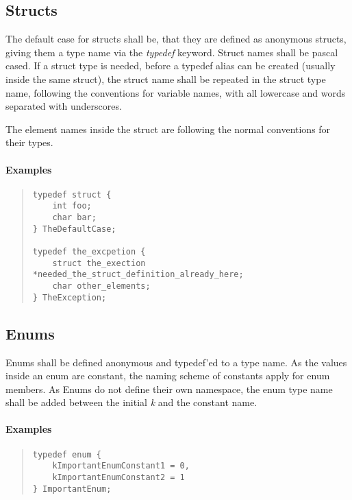 \documentclass[final,a4paper,10pt, oneside]{article}
\begin{document}
\subsection{Structs}
The default case for structs shall be, that they are defined as anonymous structs, giving them a type name via the \emph{typedef} keyword.  Struct names shall be pascal cased. If a struct type is needed, before a typedef alias can be created (usually inside the same struct), the struct name shall be repeated in the struct type name, following the conventions for variable names, with all lowercase and words separated with underscores.

The element names inside the struct are following the normal conventions for their types.

\paragraph{Examples}
\begin{quote}
\begin{lstlisting}
typedef struct {
    int foo;
    char bar;
} TheDefaultCase;

typedef the_excpetion {
    struct the_exection *needed_the_struct_definition_already_here;
    char other_elements;
} TheException;
\end{lstlisting}
\end{quote}

\subsection{Enums}
Enums shall be defined anonymous and typedef'ed to a type name. As the values inside an enum are constant, the naming scheme of constants apply for enum members. As Enums do not define their own namespace, the enum type name shall be added between the initial \emph{k} and the constant name.

\paragraph{Examples}
\begin{quote}
\begin{lstlisting}
typedef enum {
    kImportantEnumConstant1 = 0,
    kImportantEnumConstant2 = 1
} ImportantEnum;
\end{lstlisting}
\end{quote}



\end{document}
